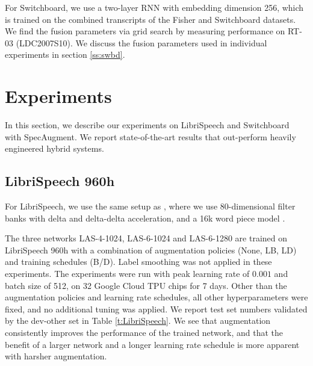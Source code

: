 \documentclass[a4paper]{article}
\begin{document}
For Switchboard, we use a two-layer RNN with embedding dimension 256, which is trained on the combined transcripts of the Fisher and Switchboard datasets. We find the fusion parameters via grid search by measuring performance on RT-03 (LDC2007S10). We discuss the fusion parameters used in individual experiments in section \ref{ss:swbd}.

\section{Experiments}

In this section, we describe our experiments on LibriSpeech and Switchboard with SpecAugment. We report state-of-the-art results that out-perform heavily engineered hybrid systems.

\subsection{LibriSpeech 960h} \label{ss:librispeech}

For LibriSpeech, we use the  same setup as \cite{irie-arxiv-2019}, where we use 80-dimensional filter banks with delta and delta-delta acceleration, and a 16k word piece model \cite{schuster-icassp-2012}.

The three networks LAS-4-1024, LAS-6-1024 and LAS-6-1280 are trained on LibriSpeech 960h with a combination of augmentation policies (None, LB, LD) and training schedules (B/D). Label smoothing was not applied in these experiments. The experiments were run with peak learning rate of $0.001$ and batch size of 512, on 32 Google Cloud TPU chips for 7 days. Other than the augmentation policies and learning rate schedules, all other hyperparameters were fixed, and no additional tuning was applied. We report test set numbers validated by the dev-other set in Table \ref{t:LibriSpeech}. We see that augmentation consistently improves the performance of the trained network, and that the benefit of a larger network and a longer learning rate schedule is more apparent with harsher augmentation.
\end{document}
